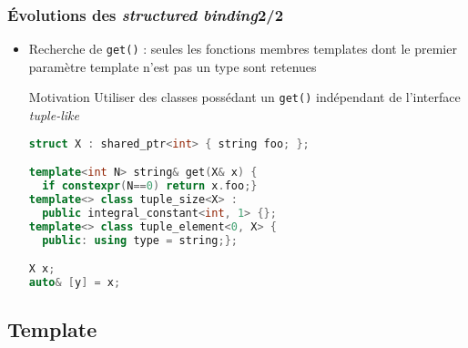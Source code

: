 \documentclass[C++.tex]{subfiles}
\begin{document}
\begin{frame}[fragile]
	\frametitle{Évolutions des \textit{structured binding}\titlehfill{}2/2}
	\begin{itemize}
		\item Recherche de \lstinline|get()| : seules les fonctions membres templates dont le premier paramètre template n'est pas un type sont retenues

		\begin{block}{Motivation}
			Utiliser des classes possédant un \lstinline|get()| indépendant de l'interface \textit{tuple-like}
		\end{block}

		\begin{lstlisting}[language=C++]
struct X : shared_ptr<int> { string foo; };

template<int N> string& get(X& x) { 
  if constexpr(N==0) return x.foo;}
template<> class tuple_size<X> : 
  public integral_constant<int, 1> {};
template<> class tuple_element<0, X> {
  public: using type = string;};

X x;
auto& [y] = x;\end{lstlisting}

	\end{itemize}
\end{frame}

\subsection*{Template}
\end{document}

